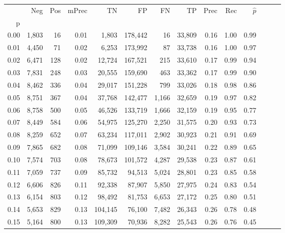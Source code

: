 \begin{tabular}{rrrrrrrrrrrrrr}
\toprule
{} &    Neg &  Pos & mPrec &       TN &       FP &      FN &      TP &  Prec &   Rec & $\hat{p}$ \\
p    &        &      &       &          &          &         &         &       &       &           \\
\midrule
0.00 &  1,803 &   16 &  0.01 &    1,803 &  178,442 &      16 &  33,809 &  0.16 &  1.00 &      0.99 \\
0.01 &  4,450 &   71 &  0.02 &    6,253 &  173,992 &      87 &  33,738 &  0.16 &  1.00 &      0.97 \\
0.02 &  6,471 &  128 &  0.02 &   12,724 &  167,521 &     215 &  33,610 &  0.17 &  0.99 &      0.94 \\
0.03 &  7,831 &  248 &  0.03 &   20,555 &  159,690 &     463 &  33,362 &  0.17 &  0.99 &      0.90 \\
0.04 &  8,462 &  336 &  0.04 &   29,017 &  151,228 &     799 &  33,026 &  0.18 &  0.98 &      0.86 \\
0.05 &  8,751 &  367 &  0.04 &   37,768 &  142,477 &   1,166 &  32,659 &  0.19 &  0.97 &      0.82 \\
0.06 &  8,758 &  500 &  0.05 &   46,526 &  133,719 &   1,666 &  32,159 &  0.19 &  0.95 &      0.77 \\
0.07 &  8,449 &  584 &  0.06 &   54,975 &  125,270 &   2,250 &  31,575 &  0.20 &  0.93 &      0.73 \\
0.08 &  8,259 &  652 &  0.07 &   63,234 &  117,011 &   2,902 &  30,923 &  0.21 &  0.91 &      0.69 \\
0.09 &  7,865 &  682 &  0.08 &   71,099 &  109,146 &   3,584 &  30,241 &  0.22 &  0.89 &      0.65 \\
0.10 &  7,574 &  703 &  0.08 &   78,673 &  101,572 &   4,287 &  29,538 &  0.23 &  0.87 &      0.61 \\
0.11 &  7,059 &  737 &  0.09 &   85,732 &   94,513 &   5,024 &  28,801 &  0.23 &  0.85 &      0.58 \\
0.12 &  6,606 &  826 &  0.11 &   92,338 &   87,907 &   5,850 &  27,975 &  0.24 &  0.83 &      0.54 \\
0.13 &  6,154 &  803 &  0.12 &   98,492 &   81,753 &   6,653 &  27,172 &  0.25 &  0.80 &      0.51 \\
0.14 &  5,653 &  829 &  0.13 &  104,145 &   76,100 &   7,482 &  26,343 &  0.26 &  0.78 &      0.48 \\
0.15 &  5,164 &  800 &  0.13 &  109,309 &   70,936 &   8,282 &  25,543 &  0.26 &  0.76 &      0.45 \\

\end{tabular}
